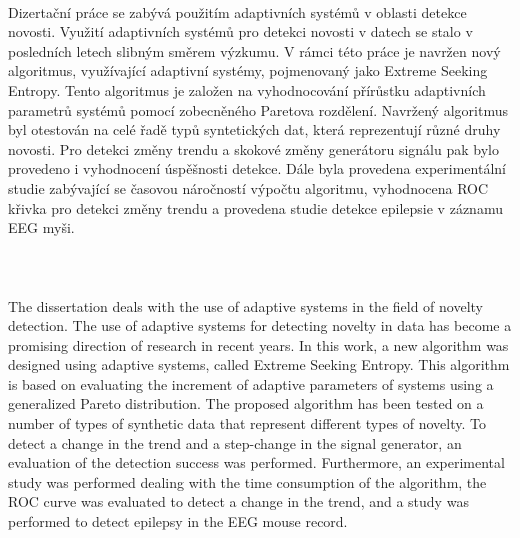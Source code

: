 



\clearpage
\thispagestyle{empty}

 \\ [5mm]
Dizertační práce se zabývá použitím adaptivních systémů v oblasti detekce novosti. Využití adaptivních systémů pro detekci novosti v datech se stalo v posledních letech slibným směrem výzkumu. V rámci této práce je navržen nový algoritmus, využívající adaptivní systémy, pojmenovaný jako Extreme Seeking Entropy. Tento algoritmus je založen na vyhodnocování přírůstku adaptivních parametrů systémů pomocí zobecněného Paretova rozdělení. Navržený algoritmus byl otestován na celé řadě typů syntetických dat, která reprezentují různé druhy novosti. Pro detekci změny trendu a skokové změny generátoru signálu pak bylo provedeno i vyhodnocení úspěšnosti detekce. Dále byla provedena experimentální studie zabývající se časovou náročností výpočtu algoritmu, vyhodnocena ROC křivka pro detekci změny trendu a provedena studie detekce epilepsie v záznamu EEG myši.\\ [5mm]
  \\ [5mm]  \\ [5mm]

 \\ [5mm] 
The dissertation deals with the use of adaptive systems in the field of novelty detection. The use of adaptive systems for detecting novelty in data has become a promising direction of research in recent years. In this work, a new algorithm was designed using adaptive systems, called Extreme Seeking Entropy. This algorithm is based on evaluating the increment of adaptive parameters of systems using a generalized Pareto distribution. The proposed algorithm has been tested on a number of types of synthetic data that represent different types of novelty. To detect a change in the trend and a step-change in the signal generator, an evaluation of the detection success was performed. Furthermore, an experimental study was performed dealing with the time consumption of the algorithm, the ROC curve was evaluated to detect a change in the trend, and a study was performed to detect epilepsy in the EEG mouse record.
\\ [5mm]



